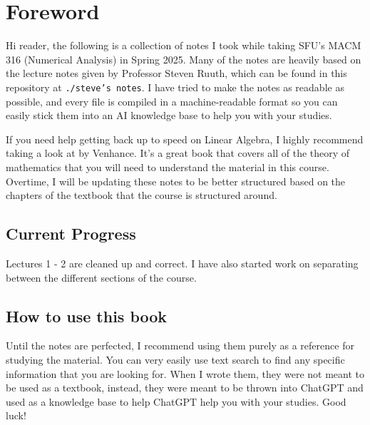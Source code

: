 \section*{Foreword}

Hi reader, the following is a collection of notes I took while taking SFU's MACM
316 (Numerical Analysis) in Spring 2025. Many of the notes are heavily based on
the lecture notes given by Professor Steven Ruuth, which can be found in this
repository at \texttt{./steve's notes}. I have tried to make the notes as
readable as possible, and every file is compiled in a machine-readable format so
you can easily stick them into an AI knowledge base to help you with your
studies.

If you need help getting back up to speed on Linear Algebra, I highly recommend
taking a look at  by Venhance. It's a great book that covers all of the
theory of mathematics that you will need to understand the material in this
course.
Overtime, I will be updating these notes to be better structured based on the
chapters of the textbook that the course is structured around.

\subsection*{Current Progress}

Lectures 1 - 2 are cleaned up and correct. I have also started work on
separating between the different sections of the course.

\subsection*{How to use this book}

Until the notes are perfected, I recommend using them purely as a reference for
studying the material. You can very easily use text search to find any specific
information that you are looking for. When I wrote them, they were not meant to
be used as a textbook, instead, they were meant to be thrown into ChatGPT and
used as a knowledge base to help ChatGPT help you with your studies. Good luck!

